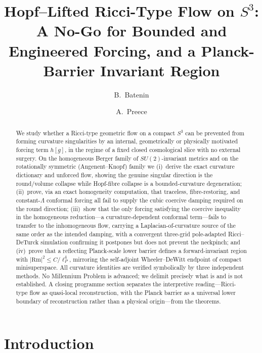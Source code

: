\documentclass[aps,prd,twocolumn,superscriptaddress,nofootinbib,floatfix]{revtex4-2}
\theoremstyle{plain}
\theoremstyle{definition}
\newcommand{\Rm}{\mathrm{Rm}}
\newcommand{\lP}{\ell_P}
\begin{document}
\title{Hopf--Lifted Ricci-Type Flow on $S^3$: A No-Go for Bounded and Engineered Forcing, and a Planck-Barrier Invariant Region}
\author{B.~Batenin}
\author{A.~Preece}
\begin{abstract}
We study whether a Ricci-type geometric flow on a compact $S^3$ can be prevented from forming curvature singularities by an internal, geometrically or physically motivated forcing term $h[g]$, in the regime of a fixed closed cosmological slice with no external surgery. On the homogeneous Berger family of $SU(2)$-invariant metrics and on the rotationally symmetric (Angenent--Knopf) family we (i)~derive the exact curvature dictionary and unforced flow, showing the genuine singular direction is the round/volume collapse while Hopf-fibre collapse is a bounded-curvature degeneration; (ii)~prove, via an exact homogeneity computation, that traceless, fibre-restoring, and constant-$\Lambda$ conformal forcing all fail to supply the cubic coercive damping required on the round direction; (iii)~show that the only forcing satisfying the coercive inequality in the homogeneous reduction---a curvature-dependent conformal term---fails to transfer to the inhomogeneous flow, carrying a Laplacian-of-curvature source of the same order as the intended damping, with a convergent three-grid pole-adapted Ricci--DeTurck simulation confirming it postpones but does not prevent the neckpinch; and (iv)~prove that a reflecting Planck-scale lower barrier defines a forward-invariant region with $|\Rm|^2\le C/\lP^4$, mirroring the self-adjoint Wheeler--DeWitt endpoint of compact minisuperspace. All curvature identities are verified symbolically by three independent methods. No Millennium Problem is advanced; we delimit precisely what is and is not established. A closing programme section separates the interpretive reading---Ricci-type flow as quasi-local reconstruction, with the Planck barrier as a universal lower boundary of reconstruction rather than a physical origin---from the theorems.
\end{abstract}
\maketitle
\section{Introduction}\label{sec:intro}
\end{document}
